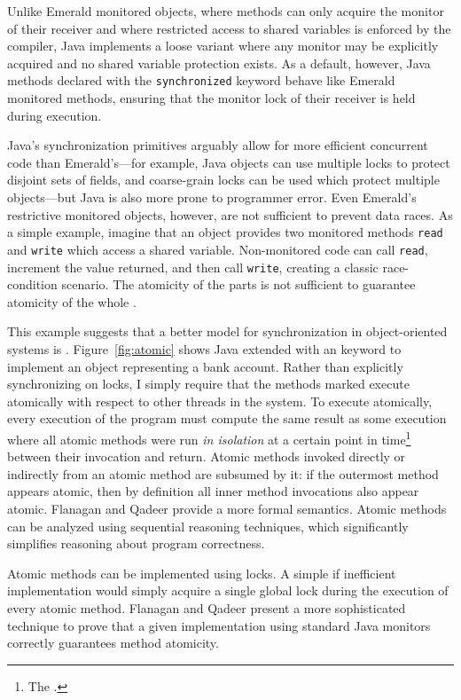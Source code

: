 Unlike Emerald monitored objects, where methods can only acquire the
monitor of their receiver and where restricted access to shared
variables is enforced by the compiler, Java implements a loose
variant where any monitor may be explicitly acquired and no shared
variable protection exists.  As a default, however, Java methods
declared with the {\tt synchronized} keyword behave like Emerald
monitored methods,
ensuring that the monitor lock of their receiver is held during execution.

Java's synchronization primitives arguably allow for more efficient
concurrent code than Emerald's---for example, Java objects can use
multiple locks to
protect disjoint sets of fields, and coarse-grain locks can be used
which protect multiple objects---but Java is also more prone to programmer
error.  Even Emerald's restrictive
monitored objects, however, are not sufficient to prevent data races.  As a
simple example, imagine that an object provides two monitored methods
{\tt read} and {\tt write} which access a shared variable.
Non-monitored code can call {\tt read}, increment the value returned,
and then call {\tt write}, creating a classic race-condition scenario.
The atomicity of the parts is not sufficient to guarantee atomicity of
the whole \cite{FlanaganQa03}.

This example suggests that a better model for synchronization in
object-oriented systems is .  Figure~\ref{fig:atomic}
shows Java extended with an \atomic keyword to implement an
object representing a bank account.  Rather than explicitly
synchronizing on locks, I simply require that the methods marked
\atomic execute atomically with respect to other threads in the
system.  To execute atomically, every execution of the program must
compute the same
result as some execution where all atomic methods were run \emph{in
  isolation} at a certain point in time\footnote{The
.} between their invocation and return.
Atomic methods invoked directly or indirectly from an atomic
method are subsumed by it: if the outermost method appears atomic,
then by definition all inner method invocations also appear atomic.
Flanagan and Qadeer \cite{FlanaganQa03} provide a more formal semantics.
Atomic methods can be analyzed using sequential reasoning techniques, which
significantly simplifies reasoning about program correctness.

Atomic methods can be implemented using locks.  A simple if inefficient
implementation would simply acquire a single global lock during
the execution of every atomic method.  Flanagan and Qadeer
\cite{FlanaganQa03} present a more sophisticated technique to prove that
a given implementation using standard Java monitors correctly
guarantees method atomicity.

